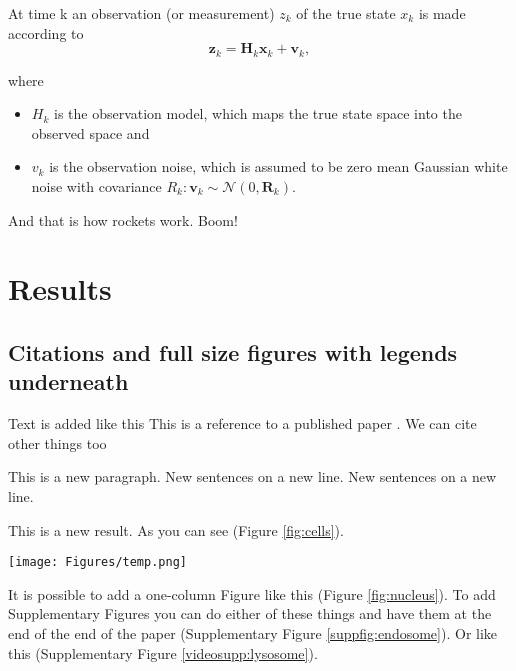 At time k an observation (or measurement) $z_k$ of the true state $x_k$ is made according to
\begin{equation}
    {\displaystyle \mathbf {z} _{k}=\mathbf {H} _{k}\mathbf {x} _{k}+\mathbf {v} _{k}},
\end{equation}

where
\begin{itemize}
    \item $H_k$ is the observation model, which maps the true state space into the observed space and
    \item $v_k$ is the observation noise, which is assumed to be zero mean Gaussian white noise with covariance ${\displaystyle R_k:  \mathbf {v} _{k}\sim {\mathcal {N}}\left(0,\mathbf {R} _{k}\right)}$.
\end{itemize}
% 
% 
And that is how rockets work. Boom!

\section*{Results}\label{s:results}

\subsection*{Citations and full size figures with legends underneath}

Text is added like this
This is a reference to a published paper \citep{watson_molecular_1953}.
We can cite other things too \citep{tipton_complexities_2019,zheng_genome_2011,alberts_molecular_2002}

This is a new paragraph.
New sentences on a new line.
New sentences on a new line.

This is a new result.
As you can see (Figure \ref{fig:cells}).

\begin{figure*}
\centering
\texttt{[image: Figures/temp.png]}
\caption{\textbf{These are cells.}\\
(\textbf{A}) This is a regular figure with a legend as a caption underneath. Inset: 3X zoom. Scale bar, \SI{10}{\micro\meter}.}
\label{fig:cells}
\end{figure*}

It is possible to add a one-column Figure like this (Figure \ref{fig:nucleus}).
To add Supplementary Figures you can do either of these things and have them at the end of the end of the paper (Supplementary Figure \ref{suppfig:endosome}).
Or like this (Supplementary Figure \ref{videosupp:lysosome}).

